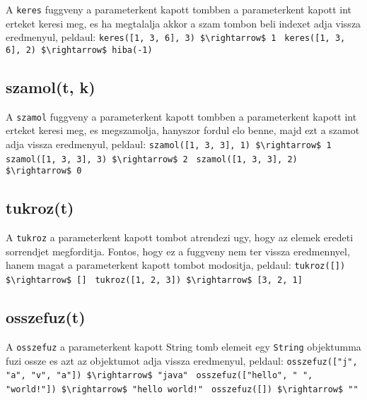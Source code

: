 \documentclass{article}
\begin{document}
A \lstinline{keres} fuggveny a parameterkent kapott tombben a parameterkent kapott int erteket keresi meg, es ha megtalalja akkor
a szam tombon beli indexet adja vissza eredmenyul, peldaul:\newline
\lstinline[mathescape]{keres([1, 3, 6], 3) $\rightarrow$ 1 }\newline
\lstinline[mathescape]{keres([1, 3, 6], 2) $\rightarrow$ hiba(-1) }\newline

\subsection{szamol(t, k)}

A \lstinline{szamol} fuggveny a parameterkent kapott tombben a parameterkent kapott int erteket keresi meg, es megszamolja, hanyszor fordul elo benne, majd ezt a szamot adja vissza eredmenyul, peldaul:\newline
\lstinline[mathescape]{szamol([1, 3, 3], 1) $\rightarrow$ 1 }\newline
\lstinline[mathescape]{szamol([1, 3, 3], 3) $\rightarrow$ 2 }\newline
\lstinline[mathescape]{szamol([1, 3, 3], 2) $\rightarrow$ 0 }\newline

\newpage
\subsection{tukroz(t)}

A \lstinline{tukroz} a parameterkent kapott tombot atrendezi ugy, hogy az elemek eredeti sorrendjet megforditja. Fontos, hogy ez a fuggveny nem ter vissza eredmennyel, hanem magat a parameterkent kapott tombot modositja, peldaul:\newline
\lstinline[mathescape]{tukroz([]) $\rightarrow$ [] }\newline
\lstinline[mathescape]{tukroz([1, 2, 3]) $\rightarrow$ [3, 2, 1]}\newline

\subsection{osszefuz(t)}

A \lstinline{osszefuz} a parameterkent kapott String tomb elemeit egy \lstinline{String} objektumma fuzi ossze es azt az objektumot adja vissza eredmenyul, peldaul:\newline
\lstinline[mathescape]{osszefuz(["j", "a", "v", "a"]) $\rightarrow$ "java" }\newline
\lstinline[mathescape]{osszefuz(["hello", " ", "world!"]) $\rightarrow$ "hello world!" }\newline
\lstinline[mathescape]{osszefuz([]) $\rightarrow$ "" }\newline
\end{document}
